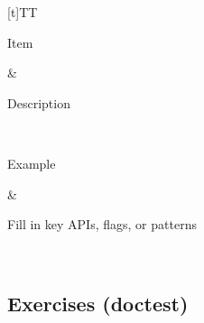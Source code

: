 \documentclass[a4paper,11pt,english]{sphinxmanual}
\begin{document}
\begin{savenotes}\sphinxattablestart
\sphinxthistablewithglobalstyle
\centering
\begin{tabulary}{\linewidth}[t]{TT}
\sphinxtoprule
\begin{varwidth}[t]{}
\sphinxstyletheadfamily \sphinxAtStartPar
Item
\sphinxbeforeendvarwidth
\end{varwidth}%
&\begin{varwidth}[t]{}
\sphinxstyletheadfamily \sphinxAtStartPar
Description
\sphinxbeforeendvarwidth
\end{varwidth}%
\\
\sphinxmidrule
\sphinxtableatstartofbodyhook\begin{varwidth}[t]{}
\sphinxAtStartPar
Example
\sphinxbeforeendvarwidth
\end{varwidth}%
&\begin{varwidth}[t]{}
\sphinxAtStartPar
Fill in key APIs, flags, or patterns
\sphinxbeforeendvarwidth
\end{varwidth}%
\\
\sphinxbottomrule
\end{tabulary}
\sphinxtableafterendhook\par
\sphinxattableend\end{savenotes}


\subsection{Exercises (doctest)}
\label{\detokenize{appendices/license_contrib:exercises-doctest}}
\begin{sphinxVerbatim}[commandchars=\\\{\}]
\end{sphinxVerbatim}



\renewcommand{\indexname}{Index}
\printindex
\end{document}

